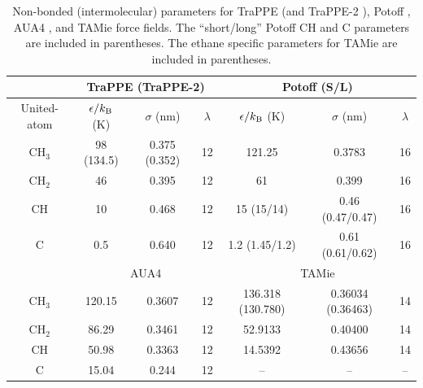 \documentclass[preprint,letterpaper,floatfix,citeautoscript,aip,jcp]{revtex4-1}
\begin{document}
\begin{table}[h!]
	\caption{Non-bonded (intermolecular) parameters for TraPPE \cite{TraPPE,Martin1999} (and TraPPE-2 \cite{TraPPEUA2}), Potoff \cite{Mie,Potoff_branched}, AUA4 \cite{AUA4,Nieto2008}, and TAMie \cite{TAMie,Weidler2016} force fields. The ``short/long'' Potoff CH and C parameters are included in parentheses. 
The ethane specific parameters for TAMie are included in parentheses.} \label{tab:nonbonded params}
	\begin{center}
		\begin{tabular}{|c|c|c|c|c|c|c|}
			\hline
			\multicolumn{1}{|c}{} & \multicolumn{3}{|c}{TraPPE  (TraPPE-2)} & \multicolumn{3}{|c|}{Potoff (S/L)}  \\ \hline
			United-atom & $\epsilon/k_{\rm B}$ (K) & $\sigma$ (nm) & $\lambda$ & $\epsilon/k_{\rm B}$ (K) & $\sigma$ (nm) & $\lambda$ \\ \hline
			CH$_3$ & 98 (134.5)  & 0.375 (0.352) & 12 & 121.25 & 0.3783 & 16  \\ 
			CH$_2$ & 46 & 0.395 & 12 & 61 & 0.399 & 16 \\ 
			CH & 10 & 0.468 & 12 & 15 (15/14) & 0.46 (0.47/0.47) & 16\\
			C & 0.5 & 0.640 & 12 & 1.2 (1.45/1.2) & 0.61 (0.61/0.62) & 16\\
			\hline
			\multicolumn{1}{|c}{} & \multicolumn{3}{|c}{AUA4} & \multicolumn{3}{|c|}{TAMie} \\ \hline
			CH$_3$ & 120.15  & 0.3607 & 12 & 136.318 (130.780) & 0.36034 (0.36463) & 14 \\ 
			CH$_2$ & 86.29 & 0.3461 & 12 & 52.9133 & 0.40400 & 14 \\ 
			CH & 50.98 & 0.3363 & 12 & 14.5392 & 0.43656 & 14\\
			C & 15.04 & 0.244 & 12 & -- & -- & --\\
			\hline
		\end{tabular}
	\end{center} 
\end{table}
\end{document}
